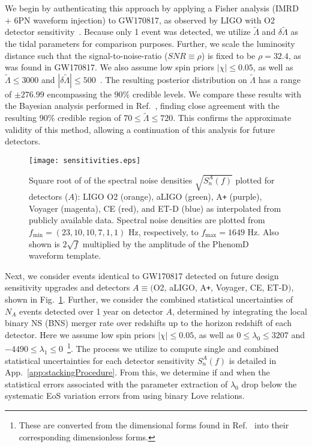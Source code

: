 \documentclass[prd,twocolumn,nofootinbib,superscriptaddress,amsmath,amssymb]{revtex4-1}
\begin{document}
We begin by authenticating this approach by applying a Fisher analysis (IMRD + 6PN waveform injection) to GW170817, as observed by LIGO with O2 detector sensitivity~\cite{aLIGO}.
Because only 1 event was detected, we utilize $\tilde\Lambda$ and $\delta\tilde\Lambda$ as the tidal parameters for comparison purposes.
Further, we scale the luminosity distance such that the signal-to-noise-ratio ($SNR \equiv \rho$) is fixed to be $\rho=32.4$, as was found in GW170817.
We also assume low spin priors $|\chi| \leq 0.05$, as well as $\tilde{\Lambda} \leq 3000$ and $|\delta \tilde{\Lambda}| \leq 500$~\cite{Wade:LambdaPriors}.
The resulting posterior distribution on $\tilde{\Lambda}$ has a range of $\pm 276.99$ encompassing the $90\%$ credible levels.
We compare these results with the Bayesian analysis performed in Ref.~\cite{TheLIGOScientific:2017qsa,Abbott2018}, finding close agreement with the resulting $90\%$ credible region of $70 \leq \tilde{\Lambda} \leq 720$.
This confirms the approximate validity of this method, allowing a continuation of this analysis for future detectors.
\begin{figure}
\begin{center} 
\texttt{[image: sensitivities.eps]}
\end{center}
\caption{
Square root of of the spectral noise densities $\sqrt{S_n^A(f)}$ plotted for detectors ($A$): LIGO O2 (orange), aLIGO (green), A\texttt{+} (purple), Voyager (magenta), CE (red), and ET-D (blue) as interpolated from publicly available data.
Spectral noise densities are plotted from $f_{\text{min}}=(23,10,10,7,1,1) \text{ Hz}$, respectively, to $f_{\text{max}}=1649 \text{ Hz}$.
Also shown is $2 \sqrt{f}$ multiplied by the amplitude of the PhenomD~\cite{PhenomDI,PhenomDII} waveform template.
}
\label{fig:sensitivities}
\end{figure}

Next, we consider events identical to GW170817 detected on future design sensitivity upgrades and detectors $A \equiv ($O2, aLIGO, A\texttt{+}, Voyager, CE, ET-D$)$, shown in Fig.~\ref{fig:sensitivities}.
Further, we consider the combined statistical uncertainties of $N_A$ events detected over 1 year on detector $A$, determined by integrating the local binary NS (BNS) merger rate over redshifts up to the horizon redshift of each detector.
Here we assume low spin priors $|\chi| \leq 0.05$, as well as $0 \leq \lambda_0 \leq 3207$ and $-4490 \leq \lambda_1 \leq 0$~\cite{delPozzo:TaylorTidal}\footnote{These are converted from the dimensional forms found in Ref.~\cite{delPozzo:TaylorTidal} into their corresponding dimensionless forms.}.
The process we utilize to compute single and combined statistical uncertainties for each detector sensitivity $S_n^A(f)$ is detailed in App.~\ref{app:stackingProcedure}.
From this, we determine if and when the statistical errors associated with the parameter extraction of $\lambda_0$ drop below the systematic EoS variation errors from using binary Love relations.
\end{document}
